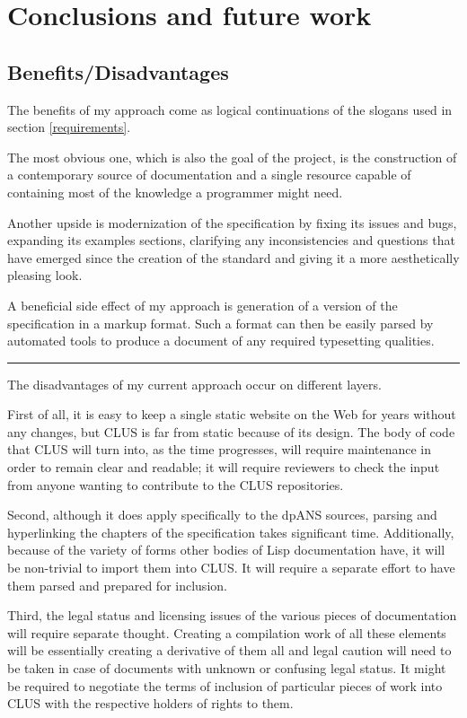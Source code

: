 \section{Conclusions and future work}

\subsection{Benefits/Disadvantages}

The benefits of my approach come as logical continuations of the slogans used in section \ref{requirements}.

The most obvious one, which is also the goal of the project, is the construction of a contemporary source of \cl{} documentation and a single resource capable of containing most of the knowledge a \cl{} programmer might need.

Another upside is modernization of the specification by fixing its issues and bugs, expanding its examples sections, clarifying any inconsistencies and questions that have emerged since the creation of the standard and giving it a more aesthetically pleasing look.

A beneficial side effect of my approach is generation of a version of the \cl{} specification in a markup format. Such a format can then be easily parsed by automated tools to produce a document of any required typesetting qualities.

\noindent\rule{\linewidth}{0.5pt}

The disadvantages of my current approach occur on different layers.

First of all, it is easy to keep a single static website on the Web for years without any changes, but CLUS is far from static because of its design. The body of code that CLUS will turn into, as the time progresses, will require maintenance in order to remain clear and readable; it will require reviewers to check the input from anyone wanting to contribute to the CLUS repositories.

Second, although it does apply specifically to the dpANS sources, parsing and hyperlinking the chapters of the specification takes significant time. Additionally, because of the variety of forms other bodies of Lisp documentation have, it will be non-trivial to import them into CLUS. It will require a separate effort to have them parsed and prepared for inclusion.

Third, the legal status and licensing issues of the various pieces of documentation will require separate thought. Creating a compilation work of all these elements will be essentially creating a derivative of them all and legal caution will need to be taken in case of documents with unknown or confusing legal status. It might be required to negotiate the terms of inclusion of particular pieces of work into CLUS with the respective holders of rights to them.

